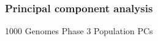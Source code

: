 \documentclass[11pt,xcolor=table]{beamer}
\begin{document}
\subsubsection{Principal component analysis}
\begin{frame}{1000 Genomes Phase 3 Population PCs}
\end{frame}
\end{document}
